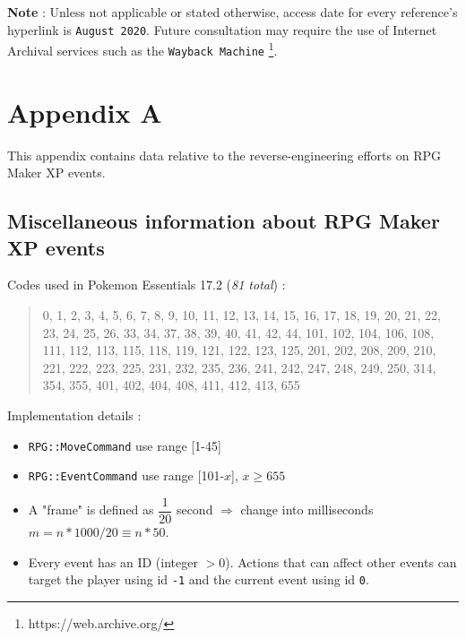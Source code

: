 \documentclass[11pt]{article}
\begin{document}
{\newpage

\nocite{*} %
\printbibliography[heading=bibintoc,title={Bibliography}]

\vspace{8mm}
\textbf{Note} : Unless not applicable or stated otherwise, access date for every reference's hyperlink is \texttt{August 2020}. Future consultation may require the use of Internet Archival services such as the \texttt{Wayback Machine} \footnote[1]{https://web.archive.org/}.



\newpage
\section*{Appendix A}

This appendix contains data relative to the reverse-engineering efforts on RPG Maker XP events.

\subsection*{Miscellaneous information about RPG Maker XP events}

Codes used in Pokemon Essentials 17.2 (\textit{81 total}) :
\begin{quote}
	0, 1, 2, 3, 4, 5, 6, 7, 8, 9, 10, 11, 12, 13, 14, 15, 16, 17, 18, 19, 20, 21, 22, 23, 24, 25, 26, 33, 34, 37, 38, 39, 40, 41, 42, 44, 101, 102, 104, 106, 108, 111, 112, 113, 115, 118, 119, 121, 122, 123, 125, 201, 202, 208, 209, 210, 221, 222, 223, 225, 231, 232, 235, 236, 241, 242, 247, 248, 249, 250, 314, 354, 355, 401, 402, 404, 408, 411, 412, 413, 655
\end{quote}

Implementation details :
\begin{itemize}
	\item \verb|RPG::MoveCommand| use range [1-45]
	
	\item \verb|RPG::EventCommand| use range [101-$x$], $x\geq 655$
	
	\item A "frame" is defined as $\dfrac{1}{20}$ second $\Rightarrow$ change into milliseconds $m=n*1000/20\equiv n*50$.
	
	\item Every event has an ID (integer $>0$). Actions that can affect other events can target the player using id \verb|-1| and the current event using id \verb|0|.
	

\end{itemize}}
\end{document}
